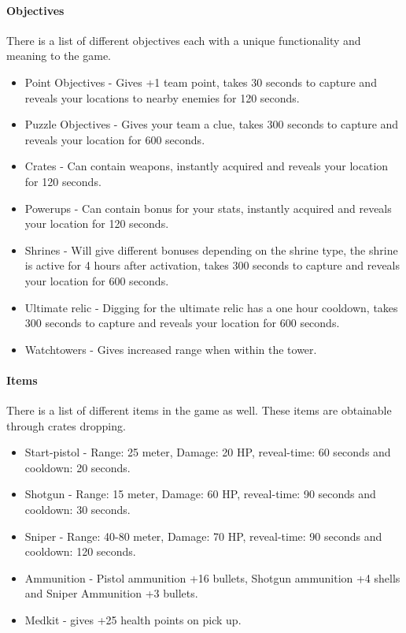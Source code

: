 \paragraph{Objectives}
There is a list of different objectives each with a unique functionality and meaning to the game.
\begin{itemize}
\item Point Objectives - Gives +1 team point, takes 30 seconds to capture and reveals your locations to nearby enemies for 120 seconds.
\item Puzzle Objectives - Gives your team a clue, takes 300 seconds to capture and reveals your location for 600 seconds.
\item Crates - Can contain weapons, instantly acquired and reveals your location for 120 seconds.
\item Powerups - Can contain bonus for your stats,  instantly acquired and reveals your location for 120 seconds.
\item Shrines - Will give different bonuses depending on the shrine type, the shrine is active for 4 hours after activation, takes 300 seconds to capture and reveals your location for 600 seconds.
\item Ultimate relic - Digging for the ultimate relic has a one hour cooldown, takes 300 seconds to capture and reveals your location for 600 seconds.
\item Watchtowers - Gives increased range when within the tower.
\end{itemize}

\paragraph{Items}
There is a list of different items in the game as well. These items are obtainable through crates dropping.
\begin{itemize}
\item Start-pistol - Range: 25 meter, Damage: 20 HP, reveal-time: 60 seconds and cooldown: 20 seconds.
\item Shotgun - Range: 15 meter, Damage: 60 HP, reveal-time: 90 seconds and cooldown: 30 seconds.
\item Sniper - Range: 40-80 meter, Damage: 70 HP, reveal-time: 90 seconds and cooldown: 120 seconds.
\item Ammunition - Pistol ammunition +16 bullets, Shotgun ammunition +4 shells and Sniper Ammunition +3 bullets.
\item Medkit - gives +25 health points on pick up.
\end{itemize}

